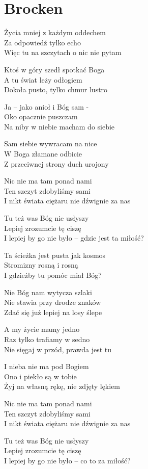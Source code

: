 \section{Brocken}
\begin{text}
    Życia mniej z każdym oddechem\\
    Za odpowiedź tylko echo\\
    Więc tu na szczytach o nic nie pytam

    Ktoś w góry szedł spotkać Boga\\
    A tu świat leży odłogiem\\
    Dokoła pusto, tylko chmur lustro

    Ja – jako anioł i Bóg sam -\\
    Oko opacznie puszczam\\
    Na niby w niebie macham do siebie

    Sam siebie wywracam na nice\\
    W Boga złamane odbicie\\
    Z przeciwnej strony duch urojony

    Nic nie ma tam ponad nami\\
    Ten szczyt zdobyliśmy sami\\
    I nikt świata ciężaru nie dźwignie za nas

    Tu też was Bóg nie usłyszy\\
    Lepiej zrozumcie tę ciszę\\
    I lepiej by go nie było – gdzie jest ta miłość?

    Ta ścieżka jest pusta jak kosmos\\
    Stromizny rosną i rosną\\
    I gdzieżby tu pomóc miał Bóg?

    Nie Bóg nam wytycza szlaki\\
    Nie stawia przy drodze znaków\\
    Zdać się już lepiej na losy ślepe

    A my życie mamy jedno\\
    Raz tylko trafiamy w sedno\\
    Nie sięgaj w przód, prawda jest tu

    I nieba nie ma pod Bogiem\\
    Ono i piekło są w tobie\\
    Żyj na własną rękę, nie zdjęty lękiem

    Nic nie ma tam ponad nami\\
    Ten szczyt zdobyliśmy sami\\
    I nikt świata ciężaru nie dźwignie za nas

    Tu też was Bóg nie usłyszy\\
    Lepiej zrozumcie tę ciszę\\
    I lepiej by go nie było – co to za miłość?
\end{text}
\begin{chord}
\end{chord}